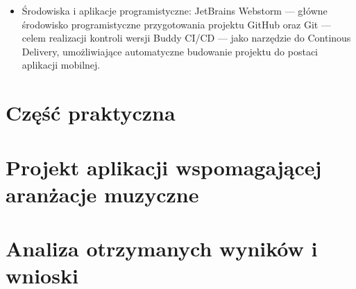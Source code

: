 \documentclass[12pt]{article}
\begin{document}
\begin{itemize}
	\item Środowiska i aplikacje programistyczne:
	      \subitem JetBrains Webstorm — główne środowisko programistyczne przygotowania projektu
	      \subitem GitHub oraz Git — celem realizacji kontroli wersji
	      \subitem Buddy CI/CD — jako narzędzie do Continous Delivery, umożliwiające automatyczne budowanie projektu do
	      postaci aplikacji mobilnej.
\end{itemize}

\newpage
{}
\section*{Część praktyczna}
\newpage
\section{Projekt aplikacji wspomagającej aranżacje muzyczne}

\newpage
\section{Analiza otrzymanych wyników i wnioski}

\newpage
{}
\printbibliography

\newpage
{}
\listoffigures

\newpage
{}
\listoftables
\end{document}
